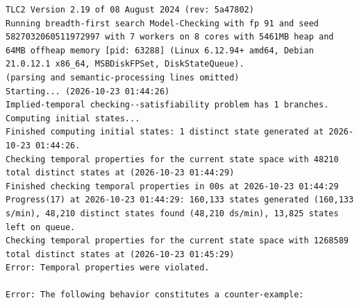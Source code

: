 \documentclass[11pt,a4paper]{article}
\begin{document}
\begin{lstlisting}[float, caption={mutations/mut\_a\_localfirst.cfg result}, captionpos=t, label={lst:tlc-mut-a-localfirst}]
TLC2 Version 2.19 of 08 August 2024 (rev: 5a47802)
Running breadth-first search Model-Checking with fp 91 and seed 5827032060511972997 with 7 workers on 8 cores with 5461MB heap and 64MB offheap memory [pid: 63288] (Linux 6.12.94+ amd64, Debian 21.0.12.1 x86_64, MSBDiskFPSet, DiskStateQueue).
(parsing and semantic-processing lines omitted)
Starting... (2026-10-23 01:44:26)
Implied-temporal checking--satisfiability problem has 1 branches.
Computing initial states...
Finished computing initial states: 1 distinct state generated at 2026-10-23 01:44:26.
Checking temporal properties for the current state space with 48210 total distinct states at (2026-10-23 01:44:29)
Finished checking temporal properties in 00s at 2026-10-23 01:44:29
Progress(17) at 2026-10-23 01:44:29: 160,133 states generated (160,133 s/min), 48,210 distinct states found (48,210 ds/min), 13,825 states left on queue.
Checking temporal properties for the current state space with 1268589 total distinct states at (2026-10-23 01:45:29)
Error: Temporal properties were violated.

Error: The following behavior constitutes a counter-example:


\end{lstlisting}
\end{document}
